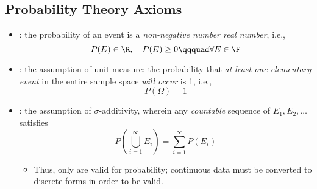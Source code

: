 \begin{itemize}
  \subsection{Probability Theory Axioms}
  \begin{itemize}
    \item {}: the probability of an event is a \emph{non-negative number real number}, i.e.,
    \[%
    P(E) \in \R,\quad P(E)\geq 0 \qqquad \forall E \in \F
    \]%
    \item {}: the assumption of unit measure; the probability that \emph{at least one elementary event} in the entire sample space \emph{will occur} is 1, i.e.,
    \[%
    P(\Omega) = 1
    \]%
    \item {}: the assumption of \(\sigma \)-additivity, wherein any \emph{countable} sequence of \hyperref[Subsection: Independent and Mutually Exclusive Events]{} \(E_1,E_2,\ldots\) satisfies
    \[%
    P\left(\bigcup_{i=1}^{\infty}E_i\right) = \sum_{i = 1}^{\infty}P(E_i)
    \]%
    \begin{itemize}
      \item Thus, only \hyperref[Subsection: Data Types]{} are valid for probability; continuous data must be converted to discrete forms in order to be valid.
    \end{itemize}
  \end{itemize}


\end{itemize}
